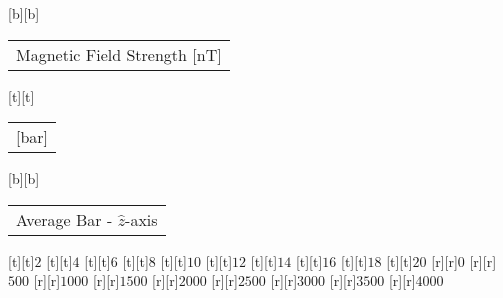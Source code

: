 %
[b][b]{\fontsize{8}{12}\selectfont \setlength{\tabcolsep}{0pt}\begin{tabular}{c}Magnetic Field Strength [nT]\end{tabular}}%
[t][t]{\fontsize{8}{12}\selectfont \setlength{\tabcolsep}{0pt}\begin{tabular}{c}[bar]\end{tabular}}%
[b][b]{\fontsize{8}{12}\selectfont \setlength{\tabcolsep}{0pt}\begin{tabular}{c}Average Bar - $\hat{z}$-axis\end{tabular}}%
%
\fontsize{6}{12}%
\selectfont%
%
[t][t]{$2$}%
[t][t]{$4$}%
[t][t]{$6$}%
[t][t]{$8$}%
[t][t]{$10$}%
[t][t]{$12$}%
[t][t]{$14$}%
[t][t]{$16$}%
[t][t]{$18$}%
[t][t]{$20$}%
%
[r][r]{$0$}%
[r][r]{$500$}%
[r][r]{$1000$}%
[r][r]{$1500$}%
[r][r]{$2000$}%
[r][r]{$2500$}%
[r][r]{$3000$}%
[r][r]{$3500$}%
[r][r]{$4000$}%
%
%
